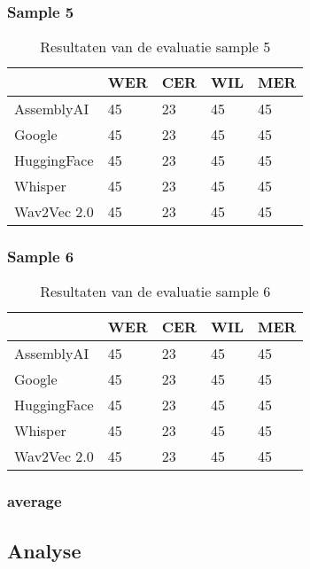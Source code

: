 \subsubsection{Sample 5}
\begin{table}[htbp]
    \centering
    \caption{Resultaten van de evaluatie sample 5}
    \label{tab:results_sample5}
    \begin{tabularx}{\textwidth}{|l|X|X|X|X|}
        \hline
        & \textbf{WER} & \textbf{CER} & \textbf{WIL} & \textbf{MER} \\ \hline
        AssemblyAI & 45 & 23 & 45 & 45 \\ \hline
        Google & 45 & 23 & 45 & 45 \\ \hline
        HuggingFace & 45 & 23 & 45 & 45 \\ \hline
        Whisper & 45 & 23 & 45 & 45 \\ \hline
        Wav2Vec 2.0 & 45 & 23 & 45 & 45 \\ \hline
    \end{tabularx}
\end{table}
\FloatBarrier


\subsubsection{Sample 6}
\begin{table}[htbp]
    \centering
    \caption{Resultaten van de evaluatie sample 6}
    \label{tab:results_sample6}
    \begin{tabularx}{\textwidth}{|l|X|X|X|X|}
        \hline
        & \textbf{WER} & \textbf{CER} & \textbf{WIL} & \textbf{MER} \\ \hline
        AssemblyAI & 45 & 23 & 45 & 45 \\ \hline
        Google & 45 & 23 & 45 & 45 \\ \hline
        HuggingFace & 45 & 23 & 45 & 45 \\ \hline
        Whisper & 45 & 23 & 45 & 45 \\ \hline
        Wav2Vec 2.0 & 45 & 23 & 45 & 45 \\ \hline
    \end{tabularx}
\end{table}
\FloatBarrier

\subsubsection{average}
\subsection{Analyse}



%
